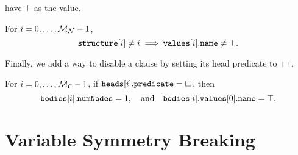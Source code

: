 have $\top$ as the value.
\begin{constraint}
  For $i = 0, \dots, \mathcal{M}_{\mathcal{N}}{} - 1$,
  \[
    \texttt{\textup{structure}}[i] \ne i \implies
    \texttt{\textup{values}}[i].\texttt{\textup{name}} \ne \top.
  \]
\end{constraint}
Finally, we add a way to disable a clause by setting its head predicate to
$\Box$.
\begin{constraint}
  For $i = 0, \dots, \mathcal{M}_{\mathcal{C}}{} - 1$, if
  $\texttt{\textup{heads}}[i].\texttt{\textup{predicate}} = \Box$, then
  \[
    \texttt{\textup{bodies}}[i].\texttt{\textup{numNodes}} = 1, \quad \text{and}
    \quad \texttt{\textup{bodies}}[i].\texttt{\textup{values}}[0].\texttt{\textup{name}} = \top.
  \]
\end{constraint}

\section{Variable Symmetry Breaking}\label{sec:variable_symmetry}

